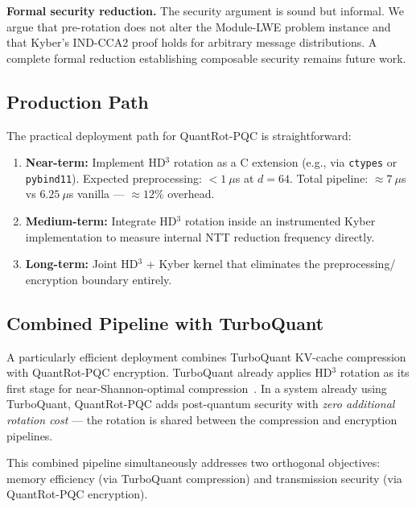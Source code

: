 \documentclass[preprint,a4paper]{article}
\begin{document}
\textbf{Formal security reduction.}
The security argument is sound but informal.
We argue that pre-rotation does not alter the
Module-LWE problem instance and that Kyber's
IND-CCA2 proof holds for arbitrary message
distributions. A complete formal reduction
establishing composable security remains future work.

\subsection{Production Path}
\label{sec:production}

The practical deployment path for QuantRot-PQC
is straightforward:

\begin{enumerate}
    \item \textbf{Near-term:} Implement HD$^3$
    rotation as a C extension (e.g., via
    \texttt{ctypes} or \texttt{pybind11}).
    Expected preprocessing: $< 1~\mu$s at $d = 64$.
    Total pipeline: $\approx 7~\mu$s vs
    $6.25~\mu$s vanilla --- $\approx 12\%$ overhead.

    \item \textbf{Medium-term:} Integrate HD$^3$
    rotation inside an instrumented Kyber
    implementation to measure internal NTT
    reduction frequency directly.

    \item \textbf{Long-term:} Joint HD$^3$ + Kyber
    kernel that eliminates the preprocessing/
    encryption boundary entirely.
\end{enumerate}

\subsection{Combined Pipeline with TurboQuant}
\label{sec:combined}

A particularly efficient deployment combines
TurboQuant KV-cache compression with QuantRot-PQC
encryption. TurboQuant already applies HD$^3$
rotation as its first stage for near-Shannon-optimal
compression~\cite{turboquant2025}. In a system
already using TurboQuant, QuantRot-PQC adds
post-quantum security with \emph{zero additional
rotation cost} --- the rotation is shared between
the compression and encryption pipelines.

This combined pipeline simultaneously addresses
two orthogonal objectives: memory efficiency
(via TurboQuant compression) and transmission
security (via QuantRot-PQC encryption).
\end{document}
